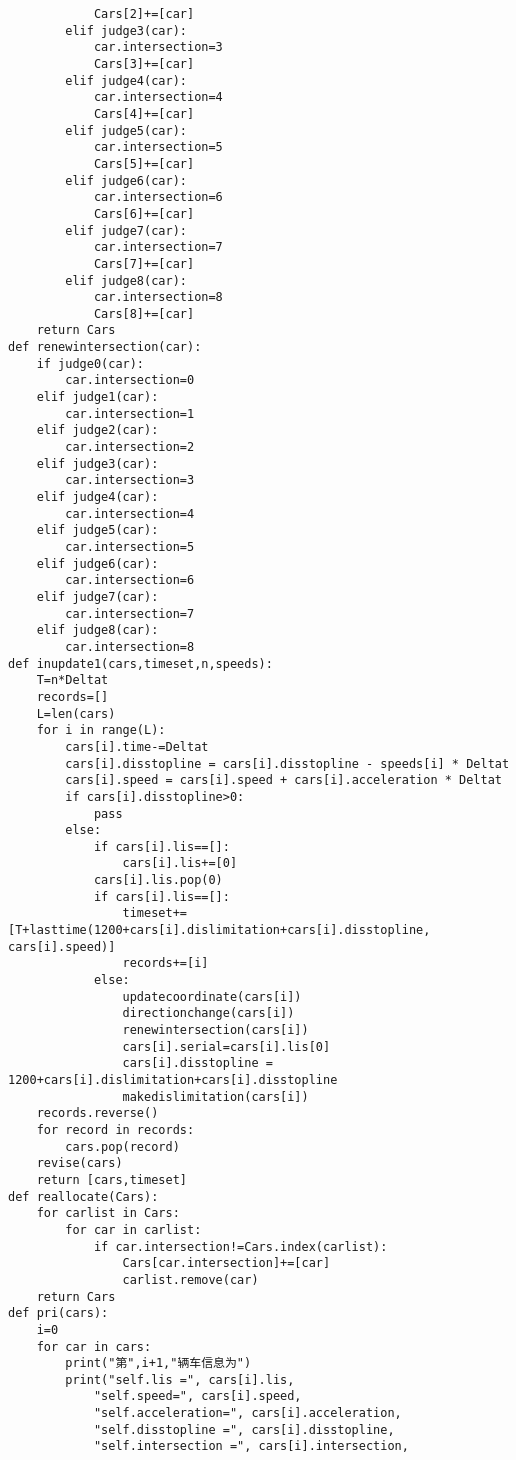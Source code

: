 \documentclass[a4paper,12pt]{article}
\numberwithin{equation}{section}
\begin{document}
\begin{appendix}
\begin{lstlisting}
            Cars[2]+=[car]
        elif judge3(car):
            car.intersection=3
            Cars[3]+=[car]
        elif judge4(car):
            car.intersection=4
            Cars[4]+=[car]
        elif judge5(car):
            car.intersection=5
            Cars[5]+=[car]
        elif judge6(car):
            car.intersection=6
            Cars[6]+=[car]
        elif judge7(car):
            car.intersection=7
            Cars[7]+=[car]
        elif judge8(car):
            car.intersection=8
            Cars[8]+=[car]
    return Cars
def renewintersection(car):
    if judge0(car):
        car.intersection=0
    elif judge1(car):
        car.intersection=1
    elif judge2(car):
        car.intersection=2
    elif judge3(car):
        car.intersection=3
    elif judge4(car):
        car.intersection=4
    elif judge5(car):
        car.intersection=5
    elif judge6(car):
        car.intersection=6
    elif judge7(car):
        car.intersection=7
    elif judge8(car):
        car.intersection=8
def inupdate1(cars,timeset,n,speeds):
    T=n*Deltat
    records=[]
    L=len(cars)
    for i in range(L):
        cars[i].time-=Deltat
        cars[i].disstopline = cars[i].disstopline - speeds[i] * Deltat
        cars[i].speed = cars[i].speed + cars[i].acceleration * Deltat
        if cars[i].disstopline>0:
            pass
        else:
            if cars[i].lis==[]:
                cars[i].lis+=[0]
            cars[i].lis.pop(0)
            if cars[i].lis==[]:
                timeset+=[T+lasttime(1200+cars[i].dislimitation+cars[i].disstopline, cars[i].speed)]
                records+=[i]
            else:
                updatecoordinate(cars[i])
                directionchange(cars[i])
                renewintersection(cars[i])
                cars[i].serial=cars[i].lis[0]
                cars[i].disstopline = 1200+cars[i].dislimitation+cars[i].disstopline
                makedislimitation(cars[i])
    records.reverse()
    for record in records:
        cars.pop(record)
    revise(cars)
    return [cars,timeset]
def reallocate(Cars):
    for carlist in Cars:
        for car in carlist:
            if car.intersection!=Cars.index(carlist):
                Cars[car.intersection]+=[car]
                carlist.remove(car)
    return Cars
def pri(cars):
    i=0
    for car in cars:
        print("第",i+1,"辆车信息为")
        print("self.lis =", cars[i].lis,
            "self.speed=", cars[i].speed,
            "self.acceleration=", cars[i].acceleration,
            "self.disstopline =", cars[i].disstopline,
            "self.intersection =", cars[i].intersection,

\end{lstlisting}
\end{appendix}
\end{document}
